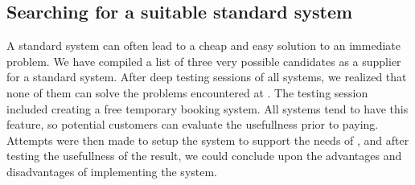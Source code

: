 \subsection{Searching for a suitable standard system}
A standard system can often lead to a cheap and easy solution to an immediate problem.
We have compiled a list of three very possible
candidates as a supplier for a standard system. 
After deep testing sessions of all systems, we realized that none
of them can solve the problems encountered at \gomonkey{}. The testing
session included creating a free temporary booking system. All systems tend to 
have this feature, so potential customers can evaluate the usefullness prior to 
paying. Attempts were then made to setup the system to support the needs of
\gomonkey{}, and after testing the usefullness of the result, we could conclude
upon the advantages and disadvantages of implementing the system.

